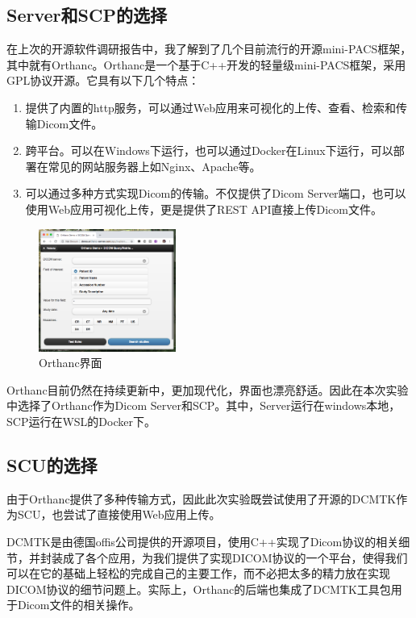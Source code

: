 \documentclass[UTF8]{ctexart}
\begin{document}
\subsection{Server和SCP的选择}
在上次的开源软件调研报告中，我了解到了几个目前流行的开源mini-PACS框架，其中就有Orthanc。Orthanc是一个基于C++开发的轻量级mini-PACS框架，采用GPL协议开源。它具有以下几个特点\cite{enwiki:1041672725}：
\begin{enumerate}
    \item 提供了内置的http服务，可以通过Web应用来可视化的上传、查看、检索和传输Dicom文件。
    \item 跨平台。可以在Windows下运行，也可以通过Docker在Linux下运行，可以部署在常见的网站服务器上如Nginx、Apache等。
    \item 可以通过多种方式实现Dicom的传输。不仅提供了Dicom Server端口，也可以使用Web应用可视化上传，更是提供了REST API直接上传Dicom文件。
\end{enumerate}
\begin{figure}[H]
    \centering
    \includegraphics[width=0.4\textwidth]{orthanc.png}
    \caption{Orthanc界面}
    \label{fig:Orthanc}
\end{figure}

Orthanc目前仍然在持续更新中，更加现代化，界面也漂亮舒适。因此在本次实验中选择了Orthanc作为Dicom Server和SCP。其中，Server运行在windows本地，SCP运行在WSL的Docker下。

\subsection{SCU的选择}
由于Orthanc提供了多种传输方式，因此此次实验既尝试使用了开源的DCMTK作为SCU，也尝试了直接使用Web应用上传。

DCMTK是由德国offis公司提供的开源项目，使用C++实现了Dicom协议的相关细节，并封装成了各个应用，为我们提供了实现DICOM协议的一个平台，使得我们可以在它的基础上轻松的完成自己的主要工作，而不必把太多的精力放在实现DICOM协议的细节问题上\cite{DCMTKbaidu}。实际上，Orthanc的后端也集成了DCMTK工具包用于Dicom文件的相关操作。
\end{document}
